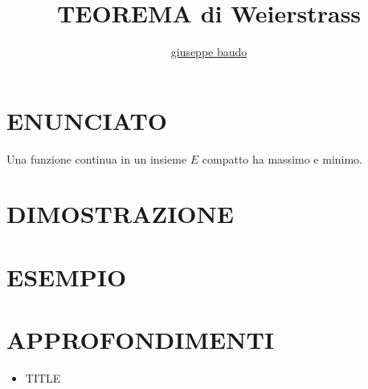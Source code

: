 \documentclass[a4paper,10pt]{article}
\title{TEOREMA di Weierstrass}
\author{\href{http://www.baudo.hol.es}{giuseppe baudo}}
\begin{document}
\maketitle

\section{ENUNCIATO}
Una funzione continua in un insieme $E$ compatto ha massimo e minimo.

\section{DIMOSTRAZIONE}

\section{ESEMPIO}

\section{APPROFONDIMENTI}
\begin{itemize}
 \item TITLE
\end{itemize}
\end{document}
